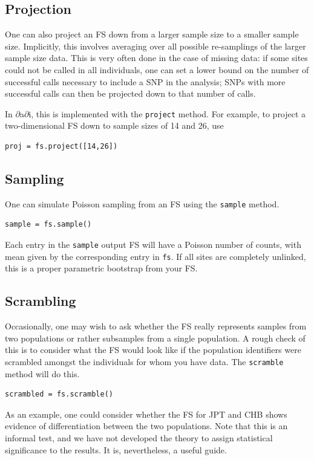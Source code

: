 \documentclass[12pt]{article}
\makeatletter
\newcommand{\dadi}{$\partial$a$\partial$i\xspace}
\newcommand{\py}[1]{\lstinline[language=Python, showstringspaces=False]@#1@}
\makeatother
\begin{document}
\subsection{Projection}

One can also project an FS down from a larger sample size to a smaller sample size.
Implicitly, this involves averaging over all possible re-samplings of the larger sample size data.
This is very often done in the case of missing data: if some sites could not be called in all individuals, one can set a lower bound on the number of successful calls necessary to include a SNP in the analysis; SNPs with more successful calls can then be projected down to that number of calls.

In \dadi, this is implemented with the \py{project} method.
For example, to project a two-dimensional FS down to sample sizes of 14 and 26, use
\begin{lstlisting}
proj = fs.project([14,26])
\end{lstlisting}

\subsection{Sampling}

One can simulate Poisson sampling from an FS using the \py{sample} method.
\begin{lstlisting}
sample = fs.sample()
\end{lstlisting}
Each entry in the \py{sample} output FS will have a Poisson number of counts, with mean given by the corresponding entry in \py{fs}.
If all sites are completely unlinked, this is a proper parametric bootstrap from your FS.

\subsection{Scrambling}

Occasionally, one may wish to ask whether the FS really represents samples from two populations or rather subsamples from a single population.
A rough check of this is to consider what the FS would look like if the population identifiers were scrambled amongst the individuals for whom you have data.
The \py{scramble} method will do this.
\begin{lstlisting}
scrambled = fs.scramble()
\end{lstlisting}
As an example, one could consider whether the FS for JPT and CHB shows evidence of differentiation between the two populations.
Note that this is an informal test, and we have not developed the theory to assign statistical significance to the results.
It is, nevertheless, a useful guide.
\end{document}
